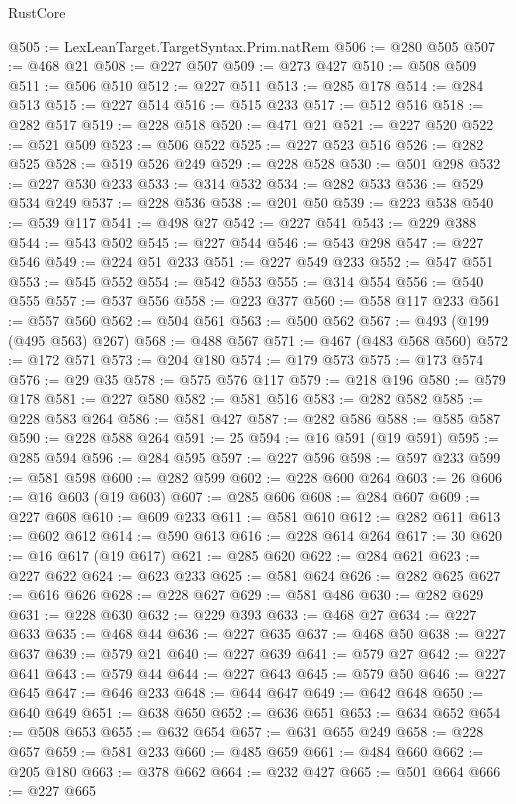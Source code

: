 \begin{lexlean}{RustCore}
\begin{coremodule}
@505 := LexLeanTarget.TargetSyntax.Prim.natRem
@506 := @280 @505
@507 := @468 @21
@508 := @227 @507
@509 := @273 @427
@510 := @508 @509
@511 := @506 @510
@512 := @227 @511
@513 := @285 @178
@514 := @284 @513
@515 := @227 @514
@516 := @515 @233
@517 := @512 @516
@518 := @282 @517
@519 := @228 @518
@520 := @471 @21
@521 := @227 @520
@522 := @521 @509
@523 := @506 @522
@525 := @227 @523 @516
@526 := @282 @525
@528 := @519 @526 @249
@529 := @228 @528
@530 := @501 @298
@532 := @227 @530 @233
@533 := @314 @532
@534 := @282 @533
@536 := @529 @534 @249
@537 := @228 @536
@538 := @201 @50
@539 := @223 @538
@540 := @539 @117
@541 := @498 @27
@542 := @227 @541
@543 := @229 @388
@544 := @543 @502
@545 := @227 @544
@546 := @543 @298
@547 := @227 @546
@549 := @224 @51 @233
@551 := @227 @549 @233
@552 := @547 @551
@553 := @545 @552
@554 := @542 @553
@555 := @314 @554
@556 := @540 @555
@557 := @537 @556
@558 := @223 @377
@560 := @558 @117 @233
@561 := @557 @560
@562 := @504 @561
@563 := @500 @562
@567 := @493 (@199 (@495 @563) @267)
@568 := @488 @567
@571 := @467 (@483 @568 @560)
@572 := @172 @571
@573 := @204 @180
@574 := @179 @573
@575 := @173 @574
@576 := @29 @35
@578 := @575 @576 @117
@579 := @218 @196
@580 := @579 @178
@581 := @227 @580
@582 := @581 @516
@583 := @282 @582
@585 := @228 @583 @264
@586 := @581 @427
@587 := @282 @586
@588 := @585 @587
@590 := @228 @588 @264
@591 := 25
@594 := @16 @591 (@19 @591)
@595 := @285 @594
@596 := @284 @595
@597 := @227 @596
@598 := @597 @233
@599 := @581 @598
@600 := @282 @599
@602 := @228 @600 @264
@603 := 26
@606 := @16 @603 (@19 @603)
@607 := @285 @606
@608 := @284 @607
@609 := @227 @608
@610 := @609 @233
@611 := @581 @610
@612 := @282 @611
@613 := @602 @612
@614 := @590 @613
@616 := @228 @614 @264
@617 := 30
@620 := @16 @617 (@19 @617)
@621 := @285 @620
@622 := @284 @621
@623 := @227 @622
@624 := @623 @233
@625 := @581 @624
@626 := @282 @625
@627 := @616 @626
@628 := @228 @627
@629 := @581 @486
@630 := @282 @629
@631 := @228 @630
@632 := @229 @393
@633 := @468 @27
@634 := @227 @633
@635 := @468 @44
@636 := @227 @635
@637 := @468 @50
@638 := @227 @637
@639 := @579 @21
@640 := @227 @639
@641 := @579 @27
@642 := @227 @641
@643 := @579 @44
@644 := @227 @643
@645 := @579 @50
@646 := @227 @645
@647 := @646 @233
@648 := @644 @647
@649 := @642 @648
@650 := @640 @649
@651 := @638 @650
@652 := @636 @651
@653 := @634 @652
@654 := @508 @653
@655 := @632 @654
@657 := @631 @655 @249
@658 := @228 @657
@659 := @581 @233
@660 := @485 @659
@661 := @484 @660
@662 := @205 @180
@663 := @378 @662
@664 := @232 @427
@665 := @501 @664
@666 := @227 @665

\end{coremodule}
\end{lexlean}
